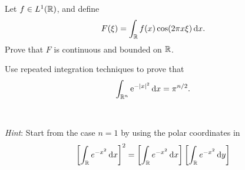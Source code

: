 \begin{problem}
  Let \(f\in L^1(\mathbb{R})\), and define
  \[
    F(\xi)=\int_{\mathbb{R}} f(x)\cos(2\pi x\xi)\mathop{}\!\mathrm{d} x.
  \]
  Prove that \(F\) is continuous and bounded on \(\mathbb{R}\).
\end{problem}
\begin{solution}
\end{solution}

\begin{problem}
  Use repeated integration techniques to prove that
  \[
    \int_{\mathbb{R}^n} \mathrm{e}^{-|x|^2}\mathop{}\!\mathrm{d} x=\pi^{n/2}.
  \]
  \\\\
  \emph{Hint}: Start from the case \(n=1\) by using the polar coordinates
  in
  \[
    \left[\int_{\bbR} e^{-x^2}\diff x\right]^2=%
    \left[\int_{\bbR} e^{-x^2}\diff x\right]%
    \left[\int_{\bbR} e^{-x^2}\diff y\right]%
  \]
\end{problem}
\begin{solution}
\end{solution}

\begin{problem}
\end{problem}
\begin{solution}
\end{solution}

